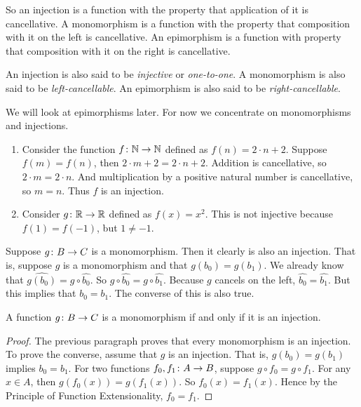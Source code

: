 So an injection is a function with the property that application of it is cancellative.
A monomorphism is a function with the property that composition with it on the left is cancellative. 
An epimorphism is a function with property that composition with it on the right is cancellative.

An injection is also said to be \emph{injective} or \emph{one-to-one}.
A monomorphism is also said to be \emph{left-cancellable}. 
An epimorphism is also said to be \emph{right-cancellable}.

We will look at epimorphisms later. For now we concentrate on monomorphisms and injections.

\printbreak
\begin{example}
	\begin{enumerate}
		\item Consider the function ${f}\colon{\mathbb N}\to{\mathbb N}$ defined as $f(n) = 2\cdot n  + 2$.
		Suppose $f(m)=f(n)$, then $2\cdot m + 2=2\cdot n+ 2$. 
		Addition is cancellative, so $2\cdot m=2\cdot n$. 
		And multiplication by a positive natural number is cancellative, so $m=n$.
		Thus $f$ is an injection.
		\item Consider ${g}\colon{\mathbb R}\to{\mathbb R}$ defined as $f(x) = x^2$. 
		This is not injective because $f(1)=f(-1)$, but $1\neq -1$.
	\end{enumerate}
\end{example}

Suppose ${g}\colon{B}\to{C}$ is a monomorphism. 
Then it clearly is also an injection. 
That is, suppose $g$ is a monomorphism and that $g(b_0)=g(b_1)$. 
We already know that $\widehat{g(b_0)} = g\circ \widehat{b_0}$.
So $g\circ \widehat{b_0} = g\circ \widehat{b_1}$.
Because $g$ cancels on the left, $\widehat{b_0} = \widehat{b_1}$.
But this implies that $b_0=b_1$.
The converse of this is also true.

\begin{lemma}
	A function ${g}\colon{B}\to{C}$ is a monomorphism if and only if it is an injection.
	\begin{proof}
		The previous paragraph proves that every monomorphism is an injection. To prove the converse, assume that $g$ is an injection. 
		That is, $g(b_0)=g(b_1)$ implies $b_0=b_1$.
		For two functions ${f_0,f_1}\colon{A}\to{B}$, suppose $g\circ f_0=g\circ f_1$. 
		For any $x\in A$, then $g(f_0(x)) = g(f_1(x))$. So $f_0(x)=f_1(x)$. Hence by the Principle of Function Extensionality, $f_0=f_1$.
	\end{proof}
\end{lemma}

